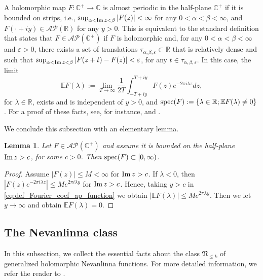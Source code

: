 \documentclass[a4paper,reqno,12pt]{amsart}
\newtheorem{lemma}[theorem]{Lemma}
\newcommand{\A}{\mathcal{A}}
\renewcommand{\P}{\mathcal{P}}
\newcommand{\NN}{\mathfrak{N}}
\renewcommand{\r}{\mathbb{R}}
\newcommand{\cp}{\mathbb{C}} %
\newcommand{\la}{\lambda}
\newcommand{\al}{\alpha}
\newcommand{\ep}{\varepsilon}
\newcommand{\cd}{\cdot}
\newcommand{\1}{{\bf 1}}
\newcommand{\ra}{\rightarrow}
\newcommand{\e}{\mathbb{E}}
\renewcommand{\Im}{{\rm Im}\,}
\newcommand{\spec}{{\rm spec}}
\begin{document}
A holomorphic map $F:\cp^+\ra\cp$ is almost periodic in the half-plane $\cp^+$ if it is bounded on strips, i.e., $\sup_{\al<\Im{z}<\beta} |F(z)|<\infty$ for any $0<\al<\beta<\infty$, and $F(\cd+iy)\in\A\P(\r)$ for any $y>0$. This is equivalent to the standard definition that states that $F\in\A\P(\cp^+)$ if $F$ is holomorphic and, for any $0<\al<\beta<\infty$ and $\ep>0$, there exists a set of translations $\tau_{\al,\beta,\ep}\subset\r$ that is relatively dense and such that $\sup_{\al<\Im{z}<\beta} |F(z+t)-F(z)|<\ep$, for any $t\in\tau_{\al,\beta,\ep}$. In this case, the limit 
\begin{equation}
\label{eq:def_Fourier_coef_ap_function}
\e F(\la):=\lim_{T\ra\infty} \frac{1}{2T} \int_{-T+iy}^{T+iy} F(z)e^{-2\pi i\la z}dz,
\end{equation}
for $\la\in\r$, exists and is independent of $y>0$, and $\spec(F):=\{\la\in\r; \e F(\la)\neq0\}$. For a proof of these facts, see, for instance, \cite[Section 1.3]{Be} and \cite[Section 3.2]{Be}.

We conclude this subsection with an elementary lemma.
\begin{lemma}
    \label{lemma:bounded_ap_function}
    Let $F\in\A\P(\cp^+)$ and assume it is bounded on the half-plane $\Im{z}>c$, for some $c>0$. Then $\spec(F)\subset[0,\infty)$.
\end{lemma}
\begin{proof}
    Assume $|F(z)|\leq M<\infty$ for $\Im{z}>c$. If $\la<0$, then $|F(z) e^{-2\pi i\la z}|\leq M e^{2\pi i\la y}$ for $\Im{z}>c$. Hence, taking $y>c$ in \eqref{eq:def_Fourier_coef_ap_function} we obtain $|\e F(\la)|\leq M e^{2\pi\la y}$. Then we let $y\ra\infty$ and obtain $\e F(\la)=0$.
\end{proof}


\subsection{The Nevanlinna class}
\label{section:Nevanlinna_class}
In this subsection, we collect the essential facts about the class $\NN_{\leq k}$ of generalized holomorphic Nevanlinna functions. For more detailed information, we refer the reader to  \cite{DL,DLLS,dB,KL,KW,GT14}.
\end{document}
